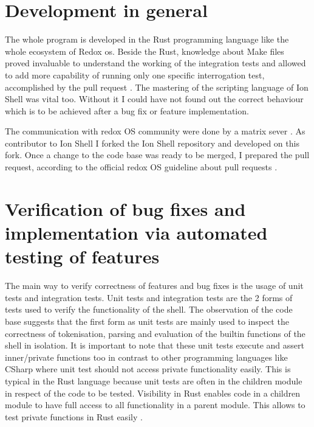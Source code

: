 \section{Development in general}

The whole program is developed in the Rust programming language like the whole ecosystem of Redox os.
Beside the Rust, knowledge about Make files proved invaluable to understand the working of the integration tests and
allowed to add more capability of running only one specific interrogation test, accomplished by the pull request \cite{pr_single_test_selectable}.
The mastering of the scripting language of Ion Shell was vital too. Without it I could have not found out the correct behaviour
which is to be achieved after a bug fix or feature implementation.

The communication with redox OS community were done by a matrix sever \cite{matrix_channel}.
As contributor to Ion Shell I forked the Ion Shell repository and developed on this fork.
Once a change to the code base was ready to be merged,
I prepared the pull request,
according to the official redox OS guideline about pull requests \cite{redox_pr_guideline}.


\section{Verification of bug fixes and implementation via automated testing of features}\label{impl:integration_test}

The main way to verify correctness of features and bug fixes is the usage of unit tests and integration tests.
Unit tests and integration tests are the 2 forms of tests used to verify the functionality of the shell.
The observation of the code base suggests that the first form as unit tests are mainly used to inspect the correctness of tokenisation, parsing and
evaluation of the builtin functions of the shell in isolation.
It is important to note that these unit tests execute and assert inner/private functions too
in contrast to other programming languages like CSharp where unit test should not access private functionality easily.
This is typical in the Rust language because unit tests are often in the children module in respect of the code to be tested.
Visibility in Rust enables code in a children module to have full access to all functionality in a parent module.
This allows to test private functions in Rust easily \cite{rust_testing_private_function}.

